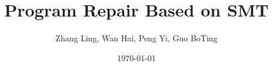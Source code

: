 \documentclass[10pt,journal,final,]{article}
\theoremstyle{definition}
\begin{document}
\title{Program Repair Based on SMT}
\author{Zhang Ling, Wan Hai, Peng Yi, Guo BoTing}
\date{\today}
\maketitle



\newpage

\newpage

\newpage

\newpage

\newpage

\newpage
{}

\end{document}
